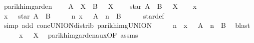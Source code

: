 \begin{isabellebody}
\ parikh{\isacharunderscore}{\kern0pt}img{\isacharunderscore}{\kern0pt}arden{\isacharcolon}{\kern0pt}\isanewline
\ \ \ {\isachardoublequoteopen}{\isasymPsi}\ {\isacharparenleft}{\kern0pt}A\ {\isacharat}{\kern0pt}{\isacharat}{\kern0pt}\ X\ {\isasymunion}\ B{\isacharparenright}{\kern0pt}\ {\isasymsubseteq}\ {\isasymPsi}\ X{\isachardoublequoteclose}\isanewline
\ \ \ {\isachardoublequoteopen}{\isasymPsi}\ {\isacharparenleft}{\kern0pt}star\ A\ {\isacharat}{\kern0pt}{\isacharat}{\kern0pt}\ B{\isacharparenright}{\kern0pt}\ {\isasymsubseteq}\ {\isasymPsi}\ X{\isachardoublequoteclose}\isanewline
%
\isadelimproof
%
\endisadelimproof
%
\isatagproof
{}\isamarkupfalse%
\isanewline
\ \ \isamarkupfalse%
\ x\isanewline
\ \ \isamarkupfalse%
\ {\isachardoublequoteopen}x\ {\isasymin}\ {\isasymPsi}\ {\isacharparenleft}{\kern0pt}star\ A\ {\isacharat}{\kern0pt}{\isacharat}{\kern0pt}\ B{\isacharparenright}{\kern0pt}{\isachardoublequoteclose}\isanewline
\ \ \isamarkupfalse%
\ \isamarkupfalse%
\ {\isachardoublequoteopen}{\isasymexists}n{\isachardot}{\kern0pt}\ x\ {\isasymin}\ {\isasymPsi}\ {\isacharparenleft}{\kern0pt}A\ {\isacharcircum}{\kern0pt}{\isacharcircum}{\kern0pt}\ n\ {\isacharat}{\kern0pt}{\isacharat}{\kern0pt}\ B{\isacharparenright}{\kern0pt}{\isachardoublequoteclose}\isanewline
\ \ \ \ \isamarkupfalse%
\ star{\isacharunderscore}{\kern0pt}def\ \isamarkupfalse%
\ {\isacharparenleft}{\kern0pt}simp\ add{\isacharcolon}{\kern0pt}\ conc{\isacharunderscore}{\kern0pt}UNION{\isacharunderscore}{\kern0pt}distrib{\isacharparenleft}{\kern0pt}{}{\isacharparenright}{\kern0pt}\ parikh{\isacharunderscore}{\kern0pt}img{\isacharunderscore}{\kern0pt}UNION{\isacharparenright}{\kern0pt}\isanewline
\ \ \isamarkupfalse%
\ \isamarkupfalse%
\ n\ \ {\isachardoublequoteopen}x\ {\isasymin}\ {\isasymPsi}\ {\isacharparenleft}{\kern0pt}A\ {\isacharcircum}{\kern0pt}{\isacharcircum}{\kern0pt}\ n\ {\isacharat}{\kern0pt}{\isacharat}{\kern0pt}\ B{\isacharparenright}{\kern0pt}{\isachardoublequoteclose}\ \isamarkupfalse%
\ blast\isanewline
\ \ \isamarkupfalse%
\ \isamarkupfalse%
\ {\isachardoublequoteopen}x\ {\isasymin}\ {\isasymPsi}\ X{\isachardoublequoteclose}\ \isamarkupfalse%
\ parikh{\isacharunderscore}{\kern0pt}img{\isacharunderscore}{\kern0pt}arden{\isacharunderscore}{\kern0pt}aux{\isacharbrackleft}{\kern0pt}OF\ assms{\isacharbrackright}{\kern0pt}\ \isamarkupfalse%

\end{isabellebody}
